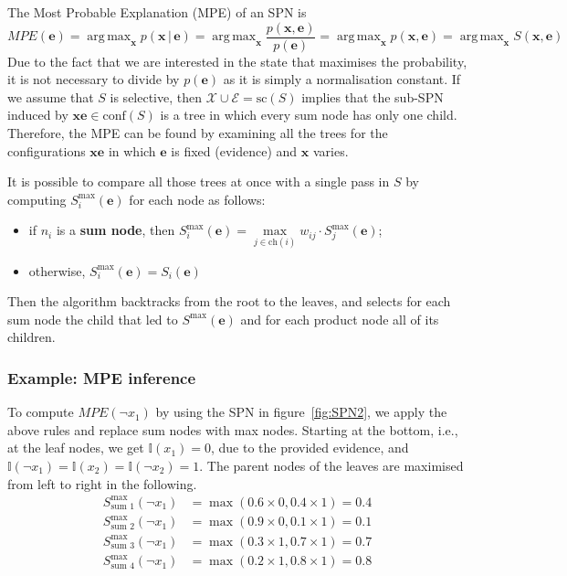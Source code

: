 \documentclass{article}
\DeclareMathOperator*{\argmax}{arg\,max}
\newcommand{\giv}{\,|\,}
\begin{document}
The Most Probable Explanation (MPE) of an SPN is 
$$
    MPE(\mathbf{e}) = \argmax_{\mathbf{x}} p(\mathbf{x} \giv \mathbf{e}) = \argmax_{\mathbf{x}} \frac{p(\mathbf{x}, \mathbf{e})}{p(\mathbf{e})} = \argmax_{\mathbf{x}} p(\mathbf{x}, \mathbf{e}) = \argmax_{\mathbf{x}} S(\mathbf{x}, \mathbf{e}) 
$$
\noindent Due to the fact that we are interested in the state that maximises the probability, it is not necessary to divide by $p(\mathbf{e})$ as it is simply a normalisation constant. If we assume that $S$ is selective, then $\mathcal{X} \cup \mathcal{E} = \text{sc}(S)$ implies that the sub-SPN induced by $\mathbf{xe} \in \text{conf}(S)$ is a tree in which every sum node has only one child. Therefore, the MPE can be found by examining all the trees for the configurations $\mathbf{xe}$ in which $\mathbf{e}$ is fixed (evidence) and $\mathbf{x}$ varies. 

It is possible to compare all those trees at once with a single pass in $S$ by computing $S_i^{\max}(\mathbf{e})$ for each node as follows:
\begin{itemize}
    \item if $n_i$ is a \textbf{sum node}, then $S_i^{\max}(\mathbf{e}) = \max\limits_{j \in \text{ch}(i)} w_{ij} \cdot S_j^{\max}(\mathbf{e})$;
    \item otherwise, $S_i^{\max}(\mathbf{e}) = S_i(\mathbf{e})$
\end{itemize}
\noindent Then the algorithm backtracks from the root to the leaves, and selects for each sum node the child that led to $S^{\max}(\mathbf{e})$ and for each product node all of its children. 

\subsubsection{Example: MPE inference}

To compute $MPE(\neg x_1)$ by using the SPN in figure~\ref{fig:SPN2}, we apply the above rules and replace sum nodes with max nodes. Starting at the bottom, i.e., at the leaf nodes, we get $\mathbb{I}(x_1) = 0$, due to the provided evidence, and $\mathbb{I}(\neg x_1) = \mathbb{I}(x_2) = \mathbb{I}(\neg x_2) = 1$. The parent nodes of the leaves are maximised from left to right in the following.
\begin{align*}
    S_{\text{sum 1}}^{\max}(\neg x_1) &= \max(0.6 \times 0, 0.4 \times 1) = 0.4\\
    S_{\text{sum 2}}^{\max}(\neg x_1) &= \max(0.9 \times 0, 0.1 \times 1) = 0.1\\
    S_{\text{sum 3}}^{\max}(\neg x_1) &= \max(0.3 \times 1, 0.7 \times 1) = 0.7\\
    S_{\text{sum 4}}^{\max}(\neg x_1) &= \max(0.2 \times 1, 0.8 \times 1) = 0.8
\end{align*}
\end{document}
